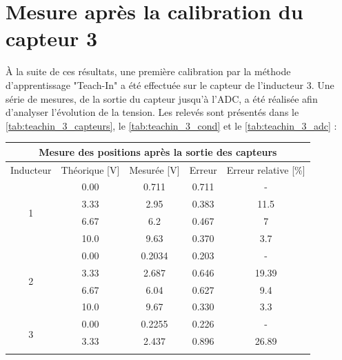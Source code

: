 \section{Mesure après la calibration du capteur 3}
À la suite de ces résultats, une première calibration par la méthode d'apprentissage "Teach-In" a été effectuée sur le capteur de l'inducteur 3. Une série de mesures, de la sortie du capteur jusqu'à l'ADC, a été réalisée afin d'analyser l'évolution de la tension. Les relevés sont présentés dans le \autoref{tab:teachin_3_capteurs}, le \autoref{tab:teachin_3_cond} et le \autoref{tab:teachin_3_adc} :

\begin{table}[H]
    \centering
    \begin{tabular}{|c|c|c|c|c|}
        \hline
        \multicolumn{5}{|c|}{\textbf{Mesure des positions après la sortie des capteurs}}             \\ \hline
        Inducteur          & Théorique {[}V{]} & Mesurée {[}V{]} & Erreur & Erreur relative {[}\%{]} \\ \hline
        \multirow{4}{*}{1} & 0.00              & 0.711           & 0.711  & -                        \\ \cline{2-5}
                           & 3.33              & 2.95            & 0.383  & 11.5                     \\ \cline{2-5}
                           & 6.67              & 6.2             & 0.467  & 7                        \\ \cline{2-5}
                           & 10.0              & 9.63            & 0.370  & 3.7                      \\ \hline
        \multirow{4}{*}{2} & 0.00              & 0.2034          & 0.203  & -                        \\ \cline{2-5}
                           & 3.33              & 2.687           & 0.646  & 19.39                    \\ \cline{2-5}
                           & 6.67              & 6.04            & 0.627  & 9.4                      \\ \cline{2-5}
                           & 10.0              & 9.67            & 0.330  & 3.3                      \\ \hline
        \multirow{4}{*}{3} & 0.00              & 0.2255          & 0.226  & -                        \\ \cline{2-5}
                           & 3.33              & 2.437           & 0.896  & 26.89                    \\ \cline{2-5}

\end{tabular}
\end{table}
